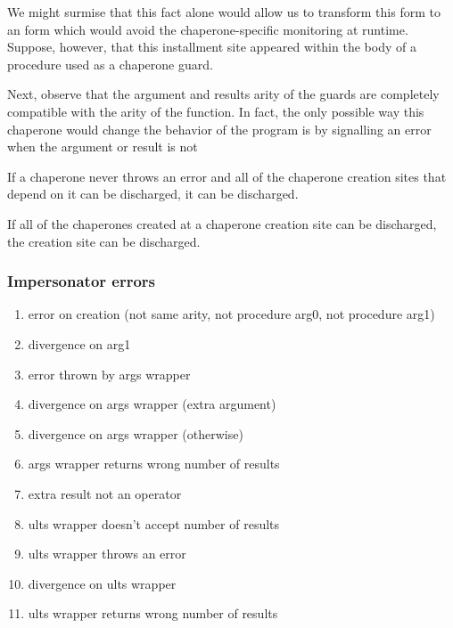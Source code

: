 \documentclass{sigplanconf}
\begin{document}
We might surmise that this fact alone would allow us to transform this  form to an  form which would avoid the chaperone-specific monitoring at runtime.
Suppose, however, that this installment site appeared within the body of a procedure used as a chaperone guard.

Next, observe that the argument and results arity of the guards are completely compatible with the arity of the function.
In fact, the only possible way this chaperone would change the behavior of the program is by signalling an error when the argument or result is not 

If a chaperone never throws an error and all of the chaperone creation sites that depend on it can be discharged, it can be discharged.

If all of the chaperones created at a chaperone creation site can be discharged, the creation site can be discharged.


\subsubsection{Impersonator errors}
\begin{enumerate}
\item error on creation (not same arity, not procedure arg0, not procedure arg1)
\item divergence on arg1
\item error thrown by args wrapper
\item divergence on args wrapper (extra argument)
\item divergence on args wrapper (otherwise)
\item args wrapper returns wrong number of results
\item extra result not an operator
\item ults wrapper doesn't accept number of results
\item ults wrapper throws an error
\item divergence on ults wrapper
\item ults wrapper returns wrong number of results
\end{enumerate}
\end{document}
